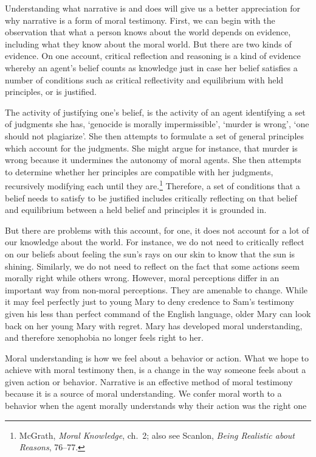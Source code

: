 \documentclass[phdthesis,12pt,final]{wuthesis}
\theoremstyle{definition}
\theoremstyle{definition}
\theoremstyle{definition}
\theoremstyle{definition}
\theoremstyle{remark}
\begin{document}
Understanding what narrative is and does will give us a better appreciation for why narrative is a form of moral testimony. First, we can begin with the observation that what a person knows about the world depends on evidence, including what they know about the moral world. But there are two kinds of evidence. On one account, critical reflection and reasoning is a kind of evidence whereby an agent's belief counts as knowledge just in case her belief satisfies a number of conditions such as critical reflectivity and equilibrium with held principles, or is justified.

The activity of justifying one's belief, is the activity of an agent identifying a set of judgments she has, `genocide is morally impermissible', `murder is wrong', `one should not plagiarize'. She then attempts to formulate a set of general principles which account for the judgments. She might argue for instance, that murder is wrong because it undermines the autonomy of moral agents. She then attempts to determine whether her principles are compatible with her judgments, recursively modifying each until they are.\footnote{McGrath, \emph{Moral {Knowledge}}, ch.~2; also see Scanlon, \emph{Being Realistic about Reasons}, 76--77.} Therefore, a set of conditions that a belief needs to satisfy to be justified includes critically reflecting on that belief and equilibrium between a held belief and principles it is grounded in.

But there are problems with this account, for one, it does not account for a lot of our knowledge about the world. For instance, we do not need to critically reflect on our beliefs about feeling the sun's rays on our skin to know that the sun is shining. Similarly, we do not need to reflect on the fact that some actions seem morally right while others wrong. However, moral perceptions differ in an important way from non-moral perceptions. They are amenable to change. While it may feel perfectly just to young Mary to deny credence to Sam's testimony given his less than perfect command of the English language, older Mary can look back on her young Mary with regret. Mary has developed moral understanding, and therefore xenophobia no longer feels right to her.

Moral understanding is how we feel about a behavior or action. What we hope to achieve with moral testimony then, is a change in the way someone feels about a given action or behavior. Narrative is an effective method of moral testimony because it is a source of moral understanding. We confer moral worth to a behavior when the agent morally understands why their action was the right one
\end{document}
